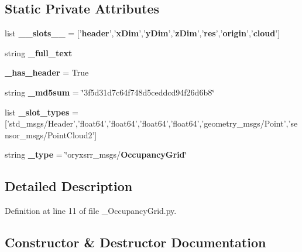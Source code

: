 \subsection*{\-Static \-Private \-Attributes}
\begin{DoxyCompactItemize}
\item 
list {\bf \-\_\-\-\_\-slots\-\_\-\-\_\-} = ['{\bf header}','{\bf x\-Dim}','{\bf y\-Dim}','{\bf z\-Dim}','{\bf res}','{\bf origin}','{\bf cloud}']
\item 
string {\bf \-\_\-full\-\_\-text}
\item 
{\bf \-\_\-has\-\_\-header} = \-True
\item 
string {\bf \-\_\-md5sum} = \char`\"{}3f5d31d7c64f748d5ceddcd94f26d6b8\char`\"{}
\item 
list {\bf \-\_\-slot\-\_\-types} = ['std\-\_\-msgs/\-Header','float64','float64','float64','float64','geometry\-\_\-msgs/\-Point','sensor\-\_\-msgs/\-Point\-Cloud2']
\item 
string {\bf \-\_\-type} = \char`\"{}oryxsrr\-\_\-msgs/{\bf \-Occupancy\-Grid}\char`\"{}
\end{DoxyCompactItemize}


\subsection{\-Detailed \-Description}


\-Definition at line 11 of file \-\_\-\-Occupancy\-Grid.\-py.



\subsection{\-Constructor \& \-Destructor \-Documentation}
